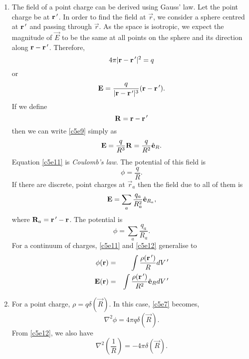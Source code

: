 \begin{enumerate}
\item The field of a point charge can be derived using Gauss' law. Let the point
charge be at $\mathbf{r}^{\,\prime}$. In order to find the field at $\vec{r}$, we consider
a sphere centred at $\mathbf{r}^{\,\prime}$ and passing through $\vec{r}$. As the space is
isotropic, we expect the magnitude of $\vec{E}$ to be the same at all points on the
sphere and its direction along $\mathbf{r} - \mathbf{r}^{\,\prime}$. Therefore,
\[
4\pi |\mathbf{r} - \mathbf{r}^{\,\prime}|^2 = q
\]
or
\begin{equation}\label{c5e9}
\mathbf{E} = \frac{q}{|\mathbf{r} - \mathbf{r}^{\,\prime}|^3}(\mathbf{r} - \mathbf{r}^{\,\prime}).
\end{equation}
If we define
\begin{equation}\label{c5e10}
\mathbf{R} = \mathbf{r} - \mathbf{r}^{\,\prime}
\end{equation}
then we can write \eqref{c5e9} simply as
\begin{equation}\label{c5e11}
\mathbf{E} = \frac{q}{R^3}\mathbf{R} = \frac{q}{R^2}\hat{\mathbf{e}}_{R}.
\end{equation}
Equation \eqref{c5e11} is \emph{Coulomb's law}. The potential of this field is
\begin{equation}\label{c5e12}
\phi = \frac{q}{R}.
\end{equation}
If there are discrete, point charges at $\vec{r}_a$ then the field due to all of 
them is
\begin{equation}\label{c5e13}
\mathbf{E} = \sum_a \frac{q_a}{R_a^2}\hat{\mathbf{e}}_{R_a},
\end{equation}
where $\mathbf{R}_a = \mathbf{r}^{\,\prime} - \mathbf{r}$. The potential is
\begin{equation}\label{c5e14}
\phi = \sum_a\frac{q_a}{R_a}.
\end{equation}
For a continuum of charges, \eqref{c5e11} and \eqref{c5e12} generalise to
\begin{eqnarray}
\phi(\mathbf{r}) &=& \int\frac{\rho(\mathbf{r}^{\,\prime})}{R}dV^{\,\prime} \label{c5e15} \\
\mathbf{E}(\mathbf{r}) &=& \int\frac{\rho(\mathbf{r}^{\,\prime})}{R^2}\hat{\mathbf{e}}_{R}dV^{\,\prime}  \label{c5e16}
\end{eqnarray}

\item For a point charge, $\rho = q\delta(\vec{R})$. In this case, \eqref{c5e7}
becomes,
\[
\nabla^2\phi = 4\pi q\delta(\vec{R}).
\]
From \eqref{c5e12}, we also have
\begin{equation}\label{c5e17}
\nabla^2\left(\frac{1}{R}\right) = -4\pi\delta(\vec{R}).
\end{equation}


\end{enumerate}
